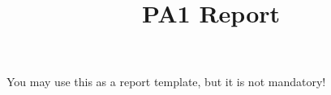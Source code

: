 \documentclass[11pt,a4paper]{article}
\title{PA1 Report}
\begin{document}
\maketitle

You may use this as a report template, but it is not mandatory!
\end{document}

